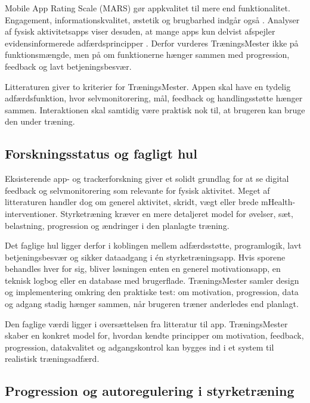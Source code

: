 Mobile App Rating Scale (MARS) gør appkvalitet til mere end funktionalitet. Engagement, informationskvalitet, æstetik og brugbarhed indgår også \cite{stoyanov2015_mobile_app_rating_scale}. Analyser af fysisk aktivitetsapps viser desuden, at mange apps kun delvist afspejler evidensinformerede adfærdsprincipper \cite{bondaronek2018_quality_pa_apps,kebede2018_evidence_informed_pa_apps,conroy2014_bct_top_ranked_pa_apps}. Derfor vurderes TræningsMester ikke på funktionsmængde, men på om funktionerne hænger sammen med progression, feedback og lavt betjeningsbesvær.

Litteraturen giver to kriterier for TræningsMester. Appen skal have en tydelig adfærdsfunktion, hvor selvmonitorering, mål, feedback og handlingsstøtte hænger sammen. Interaktionen skal samtidig være praktisk nok til, at brugeren kan bruge den under træning.

\subsection{Forskningsstatus og fagligt hul}

Eksisterende app- og trackerforskning giver et solidt grundlag for at se digital feedback og selvmonitorering som relevante for fysisk aktivitet. Meget af litteraturen handler dog om generel aktivitet, skridt, vægt eller brede mHealth-interventioner. Styrketræning kræver en mere detaljeret model for øvelser, sæt, belastning, progression og ændringer i den planlagte træning.

Det faglige hul ligger derfor i koblingen mellem adfærdsstøtte, programlogik, lavt betjeningsbesvær og sikker dataadgang i én styrketræningsapp. Hvis sporene behandles hver for sig, bliver løsningen enten en generel motivationsapp, en teknisk logbog eller en database med brugerflade. TræningsMester samler design og implementering omkring den praktiske test: om motivation, progression, data og adgang stadig hænger sammen, når brugeren træner anderledes end planlagt.

Den faglige værdi ligger i oversættelsen fra litteratur til app. TræningsMester skaber en konkret model for, hvordan kendte principper om motivation, feedback, progression, datakvalitet og adgangskontrol kan bygges ind i et system til realistisk træningsadfærd.

\subsection{Progression og autoregulering i styrketræning}

